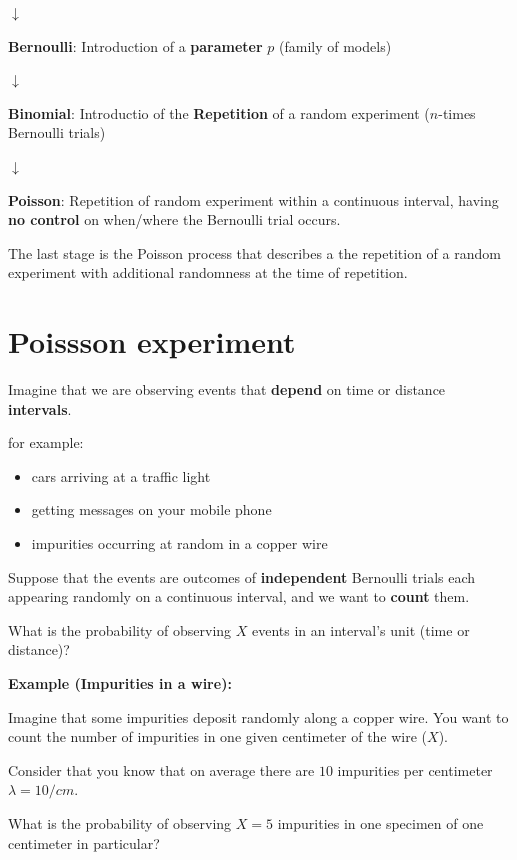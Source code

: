 \documentclass[
]{book}
\providecommand{\tightlist}{%
  \setlength{\itemsep}{0pt}\setlength{\parskip}{0pt}}
\begin{document}
\(\downarrow\)

\textbf{Bernoulli}: Introduction of a \textbf{parameter} \(p\) (family of models)

\(\downarrow\)

\textbf{Binomial}: Introductio of the \textbf{Repetition} of a random experiment (\(n\)-times Bernoulli trials)

\(\downarrow\)

\textbf{Poisson}: Repetition of random experiment within a continuous interval, having \textbf{no control} on when/where the Bernoulli trial occurs.

The last stage is the Poisson process that describes a the repetition of a random experiment with additional randomness at the time of repetition.

\hypertarget{poissson-experiment}{%
\section{Poissson experiment}\label{poissson-experiment}}

Imagine that we are observing events that \textbf{depend} on time or distance \textbf{intervals}.

for example:

\begin{itemize}
\tightlist
\item
  cars arriving at a traffic light
\item
  getting messages on your mobile phone
\item
  impurities occurring at random in a copper wire
\end{itemize}

Suppose that the events are outcomes of \textbf{independent} Bernoulli trials each appearing randomly on a continuous interval, and we want to \textbf{count} them.

What is the probability of observing \(X\) events in an interval's unit (time or distance)?

\textbf{Example (Impurities in a wire):}

Imagine that some impurities deposit randomly along a copper wire. You want to count the number of impurities in one given centimeter of the wire (\(X\)).

Consider that you know that on average there are \(10\) impurities per centimeter \(\lambda=10/cm\).

What is the probability of observing \(X=5\) impurities in one specimen of one centimeter in particular?
\end{document}

